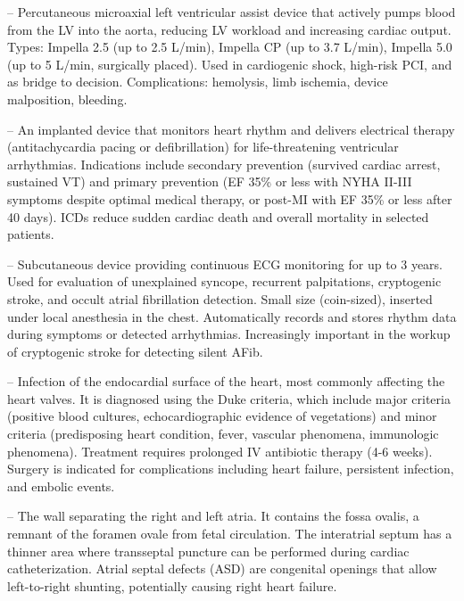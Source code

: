 -- Percutaneous microaxial left ventricular assist device that actively pumps blood from the LV into the aorta, reducing LV workload and increasing cardiac output. Types: Impella 2.5 (up to 2.5 L/min), Impella CP (up to 3.7 L/min), Impella 5.0 (up to 5 L/min, surgically placed). Used in cardiogenic shock, high-risk PCI, and as bridge to decision. Complications: hemolysis, limb ischemia, device malposition, bleeding.

-- An implanted device that monitors heart rhythm and delivers electrical therapy (antitachycardia pacing or defibrillation) for life-threatening ventricular arrhythmias. Indications include secondary prevention (survived cardiac arrest, sustained VT) and primary prevention (EF 35\% or less with NYHA II-III symptoms despite optimal medical therapy, or post-MI with EF 35\% or less after 40 days). ICDs reduce sudden cardiac death and overall mortality in selected patients.

-- Subcutaneous device providing continuous ECG monitoring for up to 3 years. Used for evaluation of unexplained syncope, recurrent palpitations, cryptogenic stroke, and occult atrial fibrillation detection. Small size (coin-sized), inserted under local anesthesia in the chest. Automatically records and stores rhythm data during symptoms or detected arrhythmias. Increasingly important in the workup of cryptogenic stroke for detecting silent AFib.

-- Infection of the endocardial surface of the heart, most commonly affecting the heart valves. It is diagnosed using the Duke criteria, which include major criteria (positive blood cultures, echocardiographic evidence of vegetations) and minor criteria (predisposing heart condition, fever, vascular phenomena, immunologic phenomena). Treatment requires prolonged IV antibiotic therapy (4-6 weeks). Surgery is indicated for complications including heart failure, persistent infection, and embolic events.

-- The wall separating the right and left atria. It contains the fossa ovalis, a remnant of the foramen ovale from fetal circulation. The interatrial septum has a thinner area where transseptal puncture can be performed during cardiac catheterization. Atrial septal defects (ASD) are congenital openings that allow left-to-right shunting, potentially causing right heart failure.

